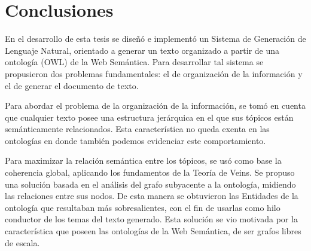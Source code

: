 \chapter{Conclusiones}
En el desarrollo de esta tesis se diseñó e implementó un Sistema de Generación de Lenguaje Natural, orientado a generar un texto organizado a partir de una ontología (OWL) de la Web Semántica. Para desarrollar tal sistema se propusieron dos problemas fundamentales: el de organización de la información y el de generar el documento de texto. 

Para abordar el problema de la organización de la información, se tomó en cuenta que cualquier texto  posee una estructura jerárquica en el que sus tópicos  están semánticamente relacionados. Esta característica no queda exenta en las ontologías en donde también podemos evidenciar este comportamiento. 

Para maximizar la relación semántica entre los tópicos, se usó como base la coherencia global, aplicando los fundamentos de la Teoría de Veins. Se propuso una solución basada en el análisis del grafo subyacente a la ontología, midiendo las relaciones entre sus nodos. De esta manera se obtuvieron las Entidades de la ontología que resultaban más sobresalientes, con el fin de usarlas como hilo conductor de los temas del texto generado.
Esta solución se vio motivada por la característica que poseen las ontologías de la Web Semántica, de ser grafos libres de escala. 


